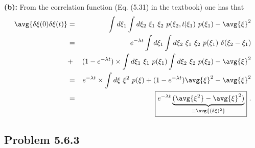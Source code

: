 \textbf{(b):} 
From the correlation function (Eq. (5.31) in the textbook) one has that
\begin{eqnarray}
\avg{\delta \xi(0) \delta \xi(t)} &=& \int d \xi_1\int d\xi_2~\xi_1~\xi_2 ~p(\xi_2, t|\xi_1)~p(\xi_1) - \avg{\xi}^2 \nonumber \\
&=& e^{-\lambda t} \int d \xi_1\int d\xi_2~\xi_1~\xi_2 ~p(\xi_1)~\delta(\xi_2-\xi_1)  \nonumber \\
&+&(1-e^{-\lambda t}) \times \int d \xi_1~\xi_1~p(\xi_1) \int d\xi_2~\xi_2 ~p(\xi_2) - \avg{\xi}^2 \nonumber \\
&=& e^{-\lambda t} \times \int d \xi~\xi^2 ~p(\xi) + (1-e^{-\lambda t}) \avg{\xi}^2 - \avg{\xi}^2 \nonumber \\
&=& \boxed{e^{-\lambda t} \underbrace{(\avg{\xi^2} - \avg{\xi}^2)}_{\equiv \avg{(\delta \xi)^2}}}~. \nonumber \\
\end{eqnarray}


\subsection{Problem 5.6.3}


